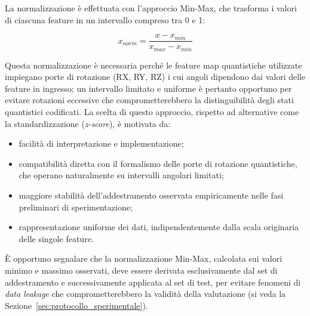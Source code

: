 La normalizzazione è effettuata con l'approccio Min-Max, che trasforma i valori di ciascuna feature in un intervallo compreso tra 0 e 1:

\begin{equation}
x_{norm} = \frac{x - x_{min}}{x_{max} - x_{min}}
\end{equation}

Questa normalizzazione è necessaria perché le feature map quantistiche utilizzate impiegano porte di rotazione (RX, RY, RZ) i cui angoli dipendono dai valori delle feature in ingresso; un intervallo limitato e uniforme è pertanto opportuno per evitare rotazioni eccessive che comprometterebbero la distinguibilità degli stati quantistici codificati. La scelta di questo approccio, rispetto ad alternative come la standardizzazione (\textit{z-score}), è motivata da:
\begin{itemize}
    \item facilità di interpretazione e implementazione;
    \item compatibilità diretta con il formalismo delle porte di rotazione quantistiche, che operano naturalmente su intervalli angolari limitati;
    \item maggiore stabilità dell'addestramento osservata empiricamente nelle fasi preliminari di sperimentazione;
    \item rappresentazione uniforme dei dati, indipendentemente dalla scala originaria delle singole feature.
\end{itemize}

È opportuno segnalare che la normalizzazione Min-Max, calcolata sui valori minimo e massimo osservati, deve essere derivata esclusivamente dal set di addestramento e successivamente applicata al set di test, per evitare fenomeni di \textit{data leakage} che comprometterebbero la validità della valutazione (si veda la Sezione~\ref{sec:protocollo_sperimentale}).

